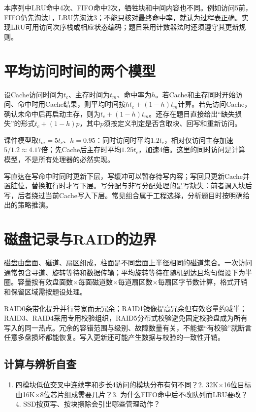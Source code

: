 本序列中LRU命中4次、FIFO命中2次，牺牲块和中间内容也不同。例如访问5前，FIFO仍先淘汰1，LRU先淘汰3；不能只核对最终命中率，就认为过程表正确。实现LRU可用访问次序栈或相应状态编码；题目采用计数器法时还须遵守其更新规则。

\section{平均访问时间的两个模型}\label{CO03-cache-model-complete}

设Cache访问时间为\(t_c\)、主存时间为\(t_m\)、命中率为\(h\)。若Cache和主存同时开始访问、命中时用Cache结果，则平均时间按\(ht_c+(1-h)t_m\)计算。若先访问Cache，确认未命中后再启动主存，则为\(t_c+(1-h)t_m\)。还存在题目直接给出``缺失损失''的形式\(t_c+(1-h)p\)，其中\(p\)须按定义判定是否含取块、回写和重新访问。

课件模型取\(t_m=5t_c\)、\(h=0.95\)：同时访问时平均\(1.2t_c\)，相对仅访问主存加速\(5/1.2\approx4.17\)倍；先Cache后主存时平均\(1.25t_c\)，加速4倍。这里的同时访问是计算模型，不是所有处理器的必然实现。

写直达在写命中时同时更新下层，写缓冲可以暂存待写内容；写回只更新Cache并置脏位，替换脏行时才写下层。写分配与非写分配处理的是写缺失：前者调入块后写，后者绕过当前Cache写入下层。常见组合属于工程选择，分析题目时按明确给出的策略推演。

\section{磁盘记录与RAID的边界}\label{CO03-disk-complete}

磁盘由盘面、磁道、扇区组成，柱面是不同盘面上半径相同的磁道集合。一次访问通常包含寻道、旋转等待和数据传输；平均旋转等待在随机到达且均匀假设下为半圈。容量按有效盘面数\ensuremath{\times}每面磁道数\ensuremath{\times}每道扇区数\ensuremath{\times}每扇区字节数计算，格式开销和保留区域需按题设处理。

RAID0条带化提升并行带宽而无冗余；RAID1镜像提高冗余但有效容量约减半；RAID3、RAID4采用专用校验组织，RAID5分布式校验避免固定校验盘成为所有写入的同一热点。冗余的容错范围与级别、故障数量有关，不能据``有校验''就断言任意多盘损坏都能恢复。写入更新还可能产生数据与校验的一致性开销。

\subsection{计算与辨析自查}\label{CO03-extra-check}

\begin{enumerate}
\def\labelenumi{\arabic{enumi}.}
\tightlist
\item
  四模块低位交叉中连续字和步长4访问的模块分布有何不同？2. 32K\ensuremath{\times}16位目标由16K\ensuremath{\times}8位芯片组成需要几片？3. 为什么FIFO命中后不改队列而LRU要改？4. SSD按页写、按块擦除会引出哪些管理动作？
\end{enumerate}

